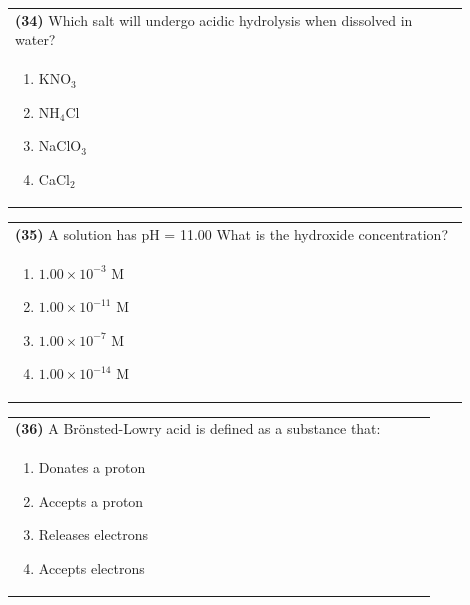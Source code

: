 \documentclass{article}
\begin{document}
\noindent\begin{tabular}{|p{0.9\linewidth}|}
\hline
\textbf{(34)} Which salt will undergo acidic hydrolysis when dissolved in water? \\[0.2cm]
\begin{minipage}{0.85\linewidth}
\begin{enumerate}[label=\alph*.]
\item KNO$_3$ \item NH$_4$Cl \item NaClO$_3$ \item CaCl$_2$
\end{enumerate}
\end{minipage}\\[0.2cm]
\hline
\end{tabular}

\noindent\begin{tabular}{|p{0.9\linewidth}|}
\hline
\textbf{(35)} A solution has pH = 11.00 What is the hydroxide concentration? \\[0.2cm]
\begin{minipage}[t]{0.85\linewidth}
\begin{enumerate}[label=\alph*.]
\item $1.00\times10^{-3}$ M \item $1.00\times10^{-11}$ M \item $1.00\times10^{-7}$ M \item $1.00\times10^{-14}$ M
\end{enumerate}
\end{minipage}\\[0.2cm]
\hline
\end{tabular}

\noindent\begin{tabular}{|p{0.9\linewidth}|}
\hline
\textbf{(36)} A Brönsted-Lowry acid is defined as a substance that: \\[0.2cm]
\begin{minipage}[t]{0.85\linewidth}
\begin{enumerate}[label=\alph*.]
\item Donates a proton
\item Accepts a proton
\item Releases electrons
\item Accepts electrons
\end{enumerate}
\end{minipage}\\[0.2cm]
\hline
\end{tabular}
\newpage
\end{document}
